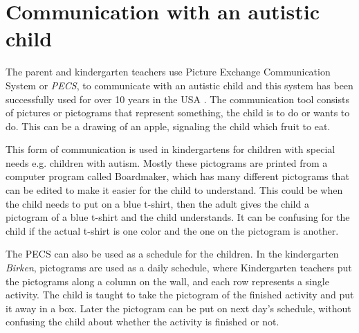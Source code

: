 \section{Communication with an autistic child}
The parent and kindergarten teachers use Picture Exchange Communication System or \emph{PECS}, to communicate with an autistic child and this system has been successfully used for over 10 years in the USA \cite{centerAutism}. The communication tool consists of pictures or pictograms that represent something, the child is to do or wants to do. This can be a drawing of an apple, signaling the child which fruit to eat. 

This form of communication is used in kindergartens for children with special needs e.g. children with autism. Mostly these pictograms are printed from a computer program called Boardmaker, which has many different pictograms that can be edited to make it easier for the child to understand\cite{centerAutism}. This could be when the child needs to put on a blue t-shirt, then the adult gives the child a pictogram of a blue t-shirt and the child understands. It can be confusing for the child if the actual t-shirt is one color and the one on the pictogram is another.

The PECS can also be used as a schedule for the children. In the kindergarten \emph{Birken}, pictograms are used as a daily schedule, where Kindergarten teachers put the pictograms along a column on the wall, and each row represents a single activity.
The child is taught to take the pictogram of the finished activity and put it away in a box. Later the pictogram can be put on next day's schedule, without confusing the child about whether the activity is finished or not.
